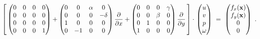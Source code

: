\begin{equation}
	\left[ \,
	\begin{pmatrix}
		0 & 0 & 0 & 0 \\
		0 & 0 & 0 & 0 \\
		0 & 0 & 0 & 0 \\
		0 & 0 & 0 & 1
	\end{pmatrix} +
	\begin{pmatrix}
		0 & 0 & \alpha & 0 \\
		0 & 0 & 0 & -\delta \\
		1 & 0 & 0 & 0 \\
		0 & -1 & 0 & 0
	\end{pmatrix} \frac{\pd}{\pd x} +
	\begin{pmatrix}
		0 & 0 & 0 & \gamma \\
		0 & 0 & \beta & 0 \\
		0 & 1 & 0 & 0 \\
		1 & 0 & 0 & 0 \\
	\end{pmatrix} \frac{\pd}{\pd y} \, \right]
	\mkern0mu \cdot \mkern2mu
	\begin{pmatrix}
		u \\ v \\ p \\ \omega
	\end{pmatrix}
	\ = \
	\begin{pmatrix}
		f_x(\mathbf{x}) \\ f_y(\mathbf{x}) \\ 0 \\ 0
	\end{pmatrix} \ .
	\vspace{1mm}
\end{equation}